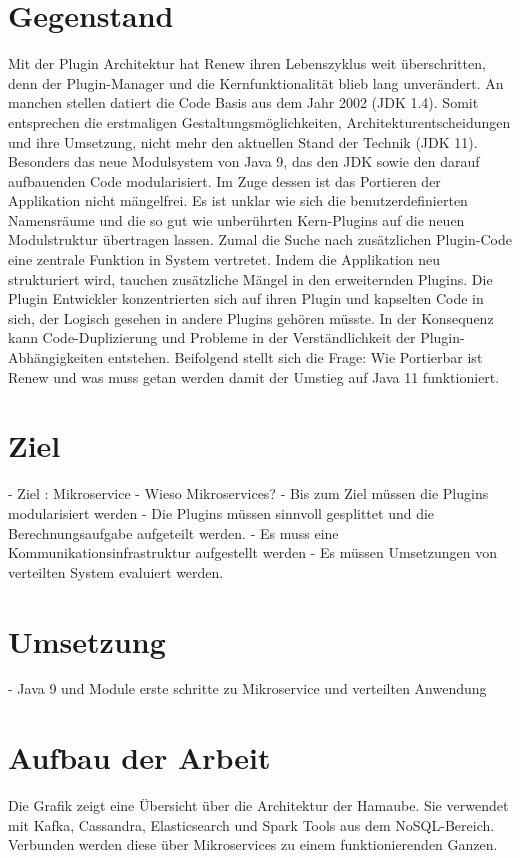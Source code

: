 \section{Gegenstand}
Mit der Plugin Architektur hat Renew ihren Lebenszyklus weit überschritten, denn der Plugin-Manager und die Kernfunktionalität blieb lang unverändert. An manchen stellen datiert die Code Basis aus dem Jahr 2002 (JDK 1.4). 
Somit entsprechen die erstmaligen Gestaltungsmöglichkeiten, Architekturentscheidungen und ihre Umsetzung, nicht mehr den aktuellen Stand der Technik (JDK 11). Besonders das neue Modulsystem von Java 9, das den JDK sowie den darauf aufbauenden Code modularisiert. 
Im Zuge dessen ist das Portieren der Applikation nicht mängelfrei. Es ist unklar wie sich die benutzerdefinierten Namensräume und die so gut wie unberührten Kern-Plugins auf die neuen Modulstruktur übertragen lassen. Zumal die Suche nach zusätzlichen Plugin-Code eine zentrale Funktion in System vertretet.\bigbreak
Indem die Applikation neu strukturiert wird, tauchen zusätzliche Mängel in den erweiternden Plugins. Die Plugin Entwickler  konzentrierten sich auf ihren Plugin und kapselten Code in sich, der Logisch gesehen in andere Plugins gehören müsste. In der Konsequenz kann Code-Duplizierung und Probleme in der Verständlichkeit der Plugin-Abhängigkeiten entstehen.\newline
Beifolgend stellt sich die Frage: Wie Portierbar ist Renew und was muss getan werden damit der Umstieg auf Java 11 funktioniert. \bigbreak

\section{Ziel}%
- Ziel : Mikroservice
- Wieso Mikroservices? 
- Bis zum Ziel müssen die Plugins modularisiert werden
- Die Plugins müssen sinnvoll gesplittet und die Berechnungsaufgabe aufgeteilt werden.
- Es muss eine Kommunikationsinfrastruktur aufgestellt werden
- Es müssen Umsetzungen von verteilten System evaluiert werden. 

\section{Umsetzung}
- Java 9 und Module erste schritte zu Mikroservice und verteilten Anwendung  
\section{Aufbau der Arbeit}



Die Grafik zeigt eine Übersicht über die Architektur der Hamaube. Sie
verwendet mit Kafka, Cassandra, Elasticsearch und Spark Tools aus dem
NoSQL-Bereich. Verbunden werden diese über Mikroservices zu einem
funktionierenden Ganzen.
